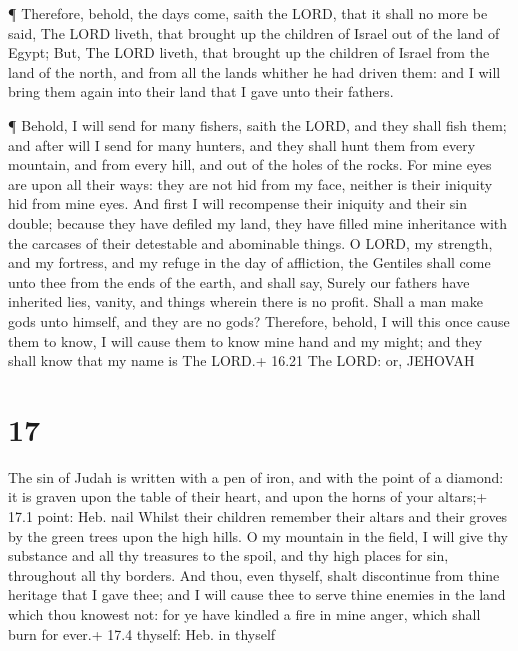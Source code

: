  ¶ Therefore, behold, the days come, saith the LORD, that
it shall no more be said, The LORD liveth, that brought up the children
of Israel out of the land of Egypt;  But, The LORD liveth,
that brought up the children of Israel from the land of the north, and
from all the lands whither he had driven them: and I will bring them
again into their land that I gave unto their fathers.

 ¶ Behold, I will send for many fishers, saith the LORD,
and they shall fish them; and after will I send for many hunters, and
they shall hunt them from every mountain, and from every hill, and out
of the holes of the rocks.  For mine eyes are upon all
their ways: they are not hid from my face, neither is their iniquity hid
from mine eyes.  And first I will recompense their iniquity
and their sin double; because they have defiled my land, they have
filled mine inheritance with the carcases of their detestable and
abominable things.  O LORD, my strength, and my fortress,
and my refuge in the day of affliction, the Gentiles shall come unto
thee from the ends of the earth, and shall say, Surely our fathers have
inherited lies, vanity, and things wherein there is no profit.
 Shall a man make gods unto himself, and they are no gods?
 Therefore, behold, I will this once cause them to know, I
will cause them to know mine hand and my might; and they shall know that
my name is The LORD.+ 16.21 The LORD: or, JEHOVAH

\hypertarget{section-16}{%
\section{17}\label{section-16}}

 The sin of Judah is written with a pen of iron, and with
the point of a diamond: it is graven upon the table of their heart, and
upon the horns of your altars;+ 17.1 point: Heb. nail 
Whilst their children remember their altars and their groves by the
green trees upon the high hills.  O my mountain in the
field, I will give thy substance and all thy treasures to the spoil, and
thy high places for sin, throughout all thy borders.  And
thou, even thyself, shalt discontinue from thine heritage that I gave
thee; and I will cause thee to serve thine enemies in the land which
thou knowest not: for ye have kindled a fire in mine anger, which shall
burn for ever.+ 17.4 thyself: Heb. in thyself

